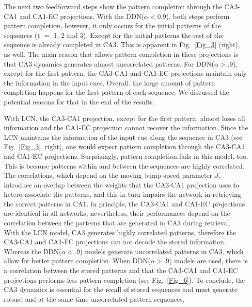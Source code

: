 \documentclass[utf8]{frontiersSCNS} %
\begin{document}
The next two feedforward steps show the pattern completion through the CA3-CA1 and CA1-EC projections. With the DDN($\alpha < 0.9$), both steps perform pattern completion, however, it only occurs for the initial patterns of the sequences (t $=$ 1, 2 and 3). 
%
Except for the initial patterns the rest of the sequence is already completed in CA3. This is apparent in Fig.~\ref{Fig_3} (right), as well.
%
The main reason that allows pattern completion in these projections is that CA3 dynamics generates almost uncorrelated patterns. 
%
For DDN($\alpha > .9$), except for the first pattern,  the CA3-CA1 and CA1-EC projections maintain only the information in the input cues. 
%
Overall, the large amount of pattern completion happens for the first pattern of each sequence. We discussed the potential reasons for that in the end of the results.           
%

With LCN, the CA3-CA1 projection, except for the first pattern, almost loses all information and the CA1-EC projection cannot recover the information.
Since the LCN maintains the information of the input cue along the sequence in CA3 (see Fig.~\ref{Fig_3}, right), one would expect pattern completion through the CA3-CA1 and CA1-EC projections. Surprisingly, pattern completion fails in this model, too. This is because patterns within and between the sequences are highly correlated. The correlations, which depend on the moving bump speed parameter $J$, introduce an overlap between the weights that the CA3-CA1 projection uses to hetero-associate the patterns, and this in turn impairs the network in retrieving the correct patterns in CA1.
%
In principle, the CA3-CA1 and CA1-EC projections are identical in all networks, nevertheless, their performances depend on the correlation between the patterns that are generated in CA3 during retrieval. With the LCN model, CA3 generates highly correlated patterns, therefore the CA3-CA1 and CA1-EC projections can not decode the stored information. Whereas the DDN($\alpha < .9$) models generate uncorrelated patterns in CA3, which allow for better pattern completion. When DDN($\alpha > .9$) models are used, there is a correlation between the stored patterns and that the CA3-CA1 and CA1-EC projections performs less pattern completion (see Fig.~\ref{Fig_6}).
%
To conclude, the CA3 dynamics is essential for the recall of stored sequences and must generate robust and at the same time uncorrelated pattern sequences.
\end{document}
